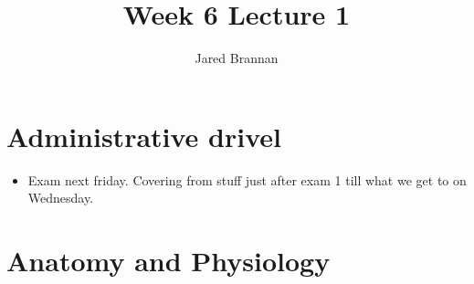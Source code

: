 \documentclass{article}
\title{Week 6 Lecture 1}
\author{Jared Brannan }
\theoremstyle{definition}
\begin{document}
\maketitle

\section{Administrative drivel}
\begin{itemize}
	\item Exam next friday. Covering from stuff just after exam 1 till what we get to on Wednesday.
\end{itemize}

\section{Anatomy and Physiology}
\end{document}
